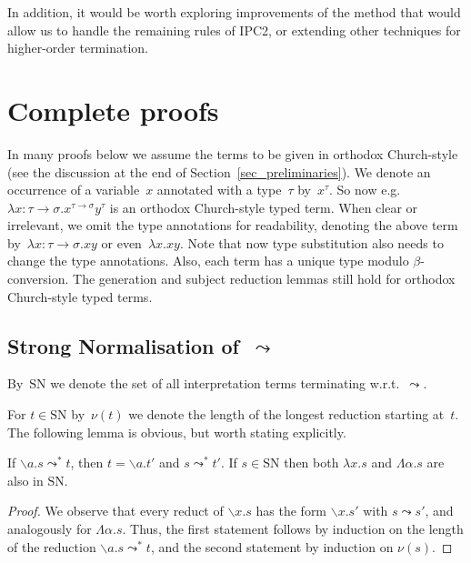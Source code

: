\documentclass[a4paper,UKenglish,cleveref,autoref,numberwithinsect]{lipics-v2019}
\theoremstyle{definition}
\newcommand{\arrtype}{\rightarrow}
\newcommand{\abstraction}[2]{\backslash #1.#2}
\newcommand{\abs}[2]{\lambda #1.#2}
\newcommand{\tabs}[2]{\Lambda #1.#2}
\newcommand{\arrW}{\leadsto}
\newcommand{\SN}{\mathrm{SN}}
\begin{document}
In addition, it would be worth exploring improvements of the method that
would allow us to handle the remaining rules of IPC2, or extending
other techniques for higher-order termination. %



\clearpage
\appendix

\section{Complete proofs}\label{app_proofs}

In many proofs below we assume the terms to be given in orthodox
Church-style (see the discussion at the end of
Section~\ref{sec_preliminaries}). We denote an occurrence of a
variable~$x$ annotated with a type~$\tau$ by~$x^\tau$. So now
e.g.~$\lambda x : \tau\arrtype\sigma . x^{\tau\arrtype\sigma}y^\tau$
is an orthodox Church-style typed term. When clear or irrelevant, we
omit the type annotations for readability, denoting the above term
by~$\lambda x : \tau\arrtype\sigma . x y$ or even~$\lambda x . x
y$. Note that now type substitution also needs to change the type
annotations. Also, each term has a unique type modulo
$\beta$-conversion. The generation and subject reduction lemmas still
hold for orthodox Church-style typed terms.

\subsection{Strong Normalisation of~$\arrW$}

By~$\SN$ we denote the set of all interpretation terms terminating
w.r.t.~$\arrW$.

For $t \in \SN$ by~$\nu(t)$ we denote the length of the longest
reduction starting at~$t$. The following lemma is obvious, but worth
stating explicitly.

\begin{lemma}\label{lem_reduce_abs}
  If $\abstraction{a}{s} \arrW^* t$, then $t = \abstraction{a}{t'}$
  and $s \arrW^* t'$.  If $s \in \SN$ then both $\abs{x}{s}$ and
  $\tabs{\alpha}{s}$ are also in $\SN$.
\end{lemma}

\begin{proof}
  We observe that every reduct of $\abstraction{x}{s}$ has the form
  $\abstraction{x}{s'}$ with $s \arrW s'$, and analogously for
  $\tabs{\alpha}{s}$.  Thus, the first statement follows by induction
  on the length of the reduction $\abstraction{a}{s} \arrW^* t$,
  and the second statement by induction on $\nu(s)$.
\end{proof}
\end{document}
